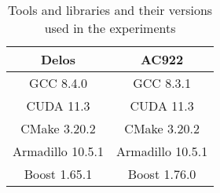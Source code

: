 \begin{table}[h!]
  \centering
  \begin{tabular}{||c | c||} 
   \hline
   Delos & AC922 \\ [0.5ex] 
   \hline\hline
   GCC 8.4.0 & GCC 8.3.1 \\
   CUDA 11.3 & CUDA 11.3 \\ 
   CMake 3.20.2 & CMake 3.20.2 \\
   Armadillo 10.5.1 & Armadillo 10.5.1 \\
   Boost 1.65.1 & Boost 1.76.0 \\ [1ex]
   \hline
  \end{tabular}
  \caption{Tools and libraries and their versions used in the experiments}
  \label{table:libversions}
\end{table}